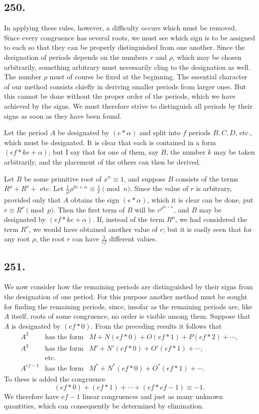 \documentclass[12pt]{article}
\begin{document}
\subsection*{250.}
In applying these rules, however, a difficulty occurs which must be removed. Since every congruence has several roots, we must see which sign is to be assigned to each so that they can be properly distinguished from one another. Since the designation of periods depends on the numbers $r$ and $\rho$, which may be chosen arbitrarily, something arbitrary must necessarily cling to the designation as well. The number $\rho$ must of course be fixed at the beginning. The essential character of our method consists chiefly in deriving smaller periods from larger ones. But this cannot be done without the proper order of the periods, which we have achieved by the signs. We must therefore strive to distinguish all periods by their signs as soon as they have been found.

Let the period $A$ be designated by $(e*\alpha)$ and split into $f$ periods $B,C,D$, etc., which must be designated. It is clear that each is contained in a form $(ef*ke+\alpha)$; but I say that for one of them, say $B$, the number $k$ may be taken arbitrarily, and the placement of the others can then be derived.

Let $R$ be some primitive root of $x^n\equiv 1$, and suppose $B$ consists of the terms $R^\mu+R^\nu+$ etc. Let $\frac{1}{\mu}\rho^{ke+\alpha}\equiv \frac{1}{\nu}\pmod n$. Since the value of $r$ is arbitrary, provided only that $A$ obtains the sign $(e*\alpha)$, which it is clear can be done, put $r\equiv R^\nu\pmod p$. Then the first term of $B$ will be $r^{\rho^{ke+\alpha}}$, and $B$ may be designated by $(ef*ke+\alpha)$. If, instead of the term $R^\mu$, we had considered the term $R^\nu$, we would have obtained another value of $r$; but it is easily seen that for any root $\rho$, the root $r$ can have $\frac{\lambda}{ef}$ different values.

\subsection*{251.}
We now consider how the remaining periods are distinguished by their signs from the designation of one period. For this purpose another method must be sought for finding the remaining periods, since, insofar as the remaining periods are, like $A$ itself, roots of some congruence, no order is visible among them. Suppose that $A$ is designated by $(ef*0)$. From the preceding results it follows that
\[
\begin{array}{rcl}
A^2&\text{has the form}&M+N(ef*0)+O(ef*1)+P(ef*2)+\cdots,\\
A^3&\text{has the form}&M'+N'(ef*0)+O'(ef*1)+\cdots,\\
&\text{etc.}&\\
A^{ef-1}&\text{has the form}&M^*+N^*(ef*0)+O^*(ef*1)+\cdots.
\end{array}
\]
To these is added the congruence
\[
(ef*0)+(ef*1)+\cdots+(ef*ef-1)\equiv -1.
\]
We therefore have $ef-1$ linear congruences and just as many unknown quantities, which can consequently be determined by elimination.
\end{document}
